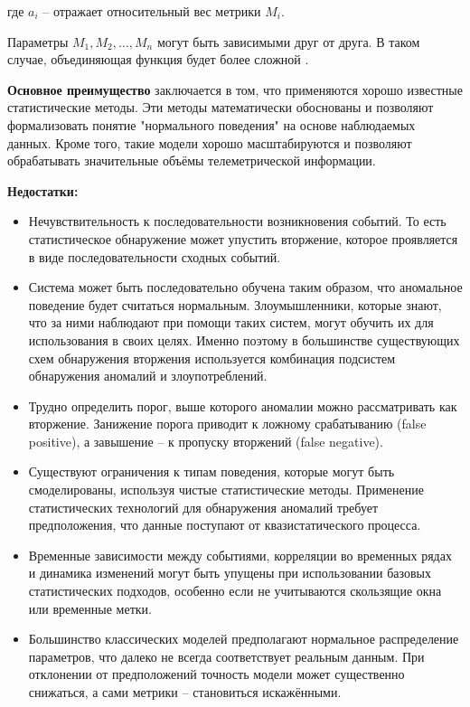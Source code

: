 где $a_i$ -- отражает относительный вес метрики $M_i$.

Параметры $M_1, M_2, \dots, M_n$ могут быть зависимыми друг от друга. В таком случае,
объединяющая функция будет более сложной \autocite{IDSystem}.

\textbf{Основное преимущество} заключается в том, что применяются хорошо известные статистические методы.
Эти методы математически обоснованы и позволяют формализовать понятие "нормального поведения" на основе наблюдаемых данных. Кроме того, такие модели хорошо масштабируются и позволяют обрабатывать значительные объёмы телеметрической информации.

\textbf{Недостатки:}
\begin{itemize}
	\item Нечувствительность к последовательности возникновения событий.
	То есть статистическое обнаружение может упустить вторжение,
	которое проявляется в виде последовательности сходных событий.
	
	\item Система может быть последовательно обучена таким образом, что аномальное поведение
	будет считаться нормальным. Злоумышленники, которые знают, что за ними наблюдают
	при помощи таких систем, могут обучить их для использования в своих целях. Именно поэтому в
	большинстве существующих схем обнаружения вторжения используется комбинация подсистем
	обнаружения аномалий и злоупотреблений.

	\item Трудно определить порог, выше которого аномалии можно рассматривать как вторжение.
	Занижение порога приводит к ложному срабатыванию (false positive), а завышение -- к пропуску вторжений (false negative).

	\item Существуют ограничения к типам поведения, которые могут быть смоделированы,
	используя чистые статистические методы. Применение статистических технологий для
	обнаружения аномалий требует предположения, что данные поступают от квазистатического процесса.

	\item Временные зависимости между событиями, корреляции во временных рядах и динамика изменений
	могут быть упущены при использовании базовых статистических подходов, особенно если не учитываются скользящие окна или временные метки.

	\item Большинство классических моделей предполагают нормальное распределение параметров,
	что далеко не всегда соответствует реальным данным. При отклонении от предположений
	точность модели может существенно снижаться, а сами метрики -- становиться искажёнными.
\end{itemize}

